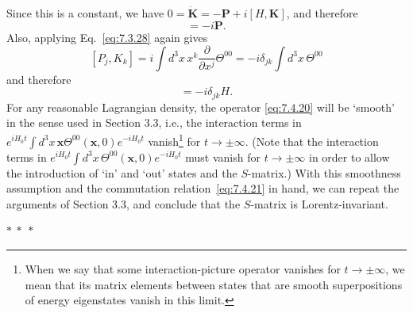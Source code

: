 Since this is a constant, we have
$0=\dot{\mathbf{K}}=-\mathbf{P}+i[H,\mathbf{K}]$, and therefore
\begin{equation}
[H,\mathbf{K}]=-i\mathbf{P}.
\tag{7.4.21}\label{eq:7.4.21}
\end{equation}
Also, applying Eq.~\eqref{eq:7.3.28} again gives
\[
[P_j,K_k]=i\int d^3x\,x^k\frac{\partial}{\partial x^j}\Theta^{00}
=-i\delta_{jk}\int d^3x\,\Theta^{00}
\]
and therefore
\begin{equation}
[P_j,K_k]=-i\delta_{jk}H.
\tag{7.4.22}\label{eq:7.4.22}
\end{equation}
For any reasonable Lagrangian density, the operator \eqref{eq:7.4.20} will be `smooth'
in the sense used in Section 3.3, i.e., the interaction terms in
$e^{iH_0t}\int d^3x\,\mathbf{x}\Theta^{00}(\mathbf{x},0)e^{-iH_0t}$
vanish\footnote{When we say that some interaction-picture operator vanishes
for $t\to\pm\infty$, we mean that its matrix elements between states that are
smooth superpositions of energy eigenstates vanish in this limit.} for
$t\to\pm\infty$. (Note that the interaction terms in
$e^{iH_0t}\int d^3x\,\Theta^{00}(\mathbf{x},0)e^{-iH_0t}$ must vanish for
$t\to\pm\infty$ in order to allow the introduction of `in' and `out' states
and the $S$-matrix.) With this smoothness assumption and the commutation
relation~\eqref{eq:7.4.21} in hand, we can repeat the arguments of Section 3.3, and
conclude that the $S$-matrix is Lorentz-invariant.

\begin{center}
$*\ *\ *$
\end{center}


